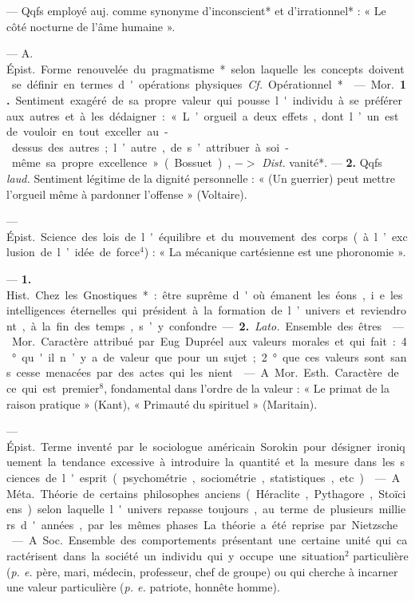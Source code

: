 \begin{itemize}[leftmargin=1cm, label=, itemsep=1pt]
 — Qqfs employé auj.
comme synonyme d’inconscient*
et d’irrationnel* : « Le côté nocturne de l’âme humaine ».

 — A. \si{Épist.} Forme
renouvelée du pragmatisme* selon
laquelle les concepts doivent se
définir en termes d'opérations
physiques. {\it Cf.} Opérationnel*.

 — \si{Mor.} {\bf 1.} Sentiment exagéré de sa propre valeur qui pousse
l'individu à se préférer aux autres
et à les dédaigner : « L’orgueil a
deux effets, dont l’un est de vouloir en tout exceller au-dessus des
autres ; l’autre, de s’attribuer à
soi-même sa propre excellence »
(Bossuet), $->$ {\it Dist.} vanité*. —
 {\bf 2.} Qqfs {\it laud.} Sentiment légitime
de la dignité personnelle : « (Un
guerrier) peut mettre l’orgueil
même à pardonner l'offense »
(Voltaire).

 — \si{Épist.} Science des
lois de l'équilibre et du mouvement des corps (à l’exclusion de
l’idée de force$^4$) : « La mécanique
cartésienne est une phoronomie ».

 — {\bf 1.} \si{Hist.} Chez les Gnostiques* : être suprême d'où émanent les éons, i.e. les intelligences
éternelles qui président à la formation de l’univers et reviendront,
à la fin des temps, s’y confondre.
— {\bf 2.} {\it Lato.} Ensemble des êtres.

 — \si{Mor.} Caractère attribué
par Eug. Dupréel aux valeurs
morales et qui fait : 4° qu'il n’y a
de valeur que pour un sujet ; 2°
que ces valeurs sont sans cesse
menacées par des actes qui les
nient.

 — A. \si{Mor.} \si{Esth.}
Caractère de ce qui est premier$^8$,
fondamental dans l’ordre de la
valeur : « Le primat de la raison
pratique » (Kant), « Primauté du
spirituel » (Maritain).

 — \si{Épist.} Terme inventé par le sociologue américain
Sorokin pour désigner ironiquement la tendance excessive à introduire la quantité et la mesure dans
les sciences de l'esprit (psychométrie, sociométrie, statistiques,
etc.).

 — A. \si{Méta.} Théorie
de certains philosophes anciens
(Héraclite, Pythagore, Stoïciens)
selon laquelle l'univers repasse
toujours, au terme de plusieurs
milliers d'années, par les mêmes
phases. La théorie a été reprise
par Nietzsche.

 — A. \si{Soc.} Ensemble des
comportements présentant une
certaine unité qui caractérisent
dans la société un individu qui y
occupe une situation$^2$ particulière
({\it p. e.} père, mari, médecin, professeur, chef de groupe) ou qui
cherche à incarner une valeur
particulière ({\it p. e.} patriote, honnête
homme).


\end{itemize}
